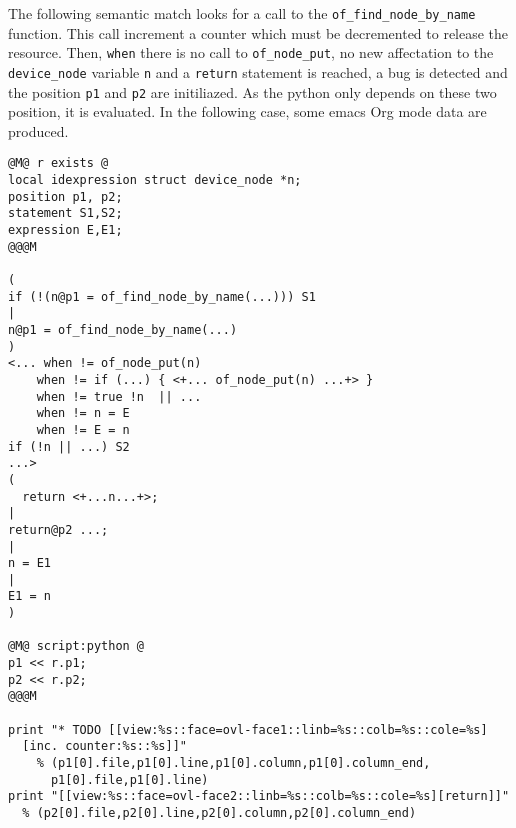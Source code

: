 The following semantic match looks for a call to the
\texttt{of\_find\_node\_by\_name} function. This call increment a
counter which must be decremented to release the resource. Then,
\texttt{when} there is no call to \texttt{of\_node\_put}, no new
affectation to the \texttt{device\_node} variable \texttt{n} and a
\texttt{return} statement is reached, a bug is detected and the
position \texttt{p1} and \texttt{p2} are initiliazed. As the python
only depends on these two position, it is evaluated. In the following
case, some emacs Org mode data are produced.

\begin{lstlisting}[language=Cocci]
@M@ r exists @
local idexpression struct device_node *n;
position p1, p2;
statement S1,S2;
expression E,E1;
@@@M

(
if (!(n@p1 = of_find_node_by_name(...))) S1
|
n@p1 = of_find_node_by_name(...)
)
<... when != of_node_put(n)
    when != if (...) { <+... of_node_put(n) ...+> }
    when != true !n  || ...
    when != n = E
    when != E = n
if (!n || ...) S2
...>
(
  return <+...n...+>;
|
return@p2 ...;
|
n = E1
|
E1 = n
)

@M@ script:python @
p1 << r.p1;
p2 << r.p2;
@@@M

print "* TODO [[view:%s::face=ovl-face1::linb=%s::colb=%s::cole=%s]
  [inc. counter:%s::%s]]"
    % (p1[0].file,p1[0].line,p1[0].column,p1[0].column_end,
      p1[0].file,p1[0].line)
print "[[view:%s::face=ovl-face2::linb=%s::colb=%s::cole=%s][return]]"
  % (p2[0].file,p2[0].line,p2[0].column,p2[0].column_end)
\end{lstlisting}


